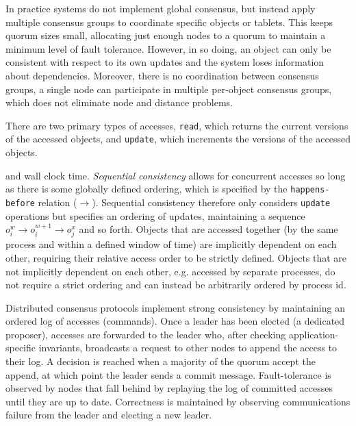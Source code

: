 In practice systems do not implement global consensus, but instead apply multiple
consensus groups to coordinate specific objects or tablets.
This keeps quorum sizes small, allocating just enough nodes to a quorum to maintain a
minimum level of fault tolerance.
However, in so doing, an object can only be consistent with respect to its own updates
and the system loses information about dependencies.
Moreover, there is no coordination between consensus groups, a single node can
participate in multiple per-object consensus groups, which does not eliminate node and
distance problems.


There are two primary types of accesses, \texttt{read}, which returns the
current versions of the accessed objects, and \texttt{update}, which
increments the versions of the accessed objects.

and wall clock time.
\emph{Sequential consistency} allows for concurrent accesses so long as there
is some globally defined ordering, which is specified by the
\texttt{happens-before} relation ($\rightarrow$).
Sequential consistency therefore only considers \texttt{update} operations but
specifies an ordering of updates, maintaining a sequence $o_i^w \rightarrow
o_i^{w+1} \rightarrow o_j^x$ and so forth.
Objects that are accessed together (by the same process and within a defined
window of time) are implicitly dependent on each other, requiring their
relative access order to be strictly defined.
Objects that are not implicitly dependent on each other, e.g.
accessed by separate processes, do not require a strict ordering and can
instead be arbitrarily ordered by process id.

Distributed consensus protocols implement strong consistency by maintaining an
ordered log of accesses (commands).
Once a leader has been elected (a dedicated proposer), accesses are forwarded
to the leader who, after checking application-specific invariants, broadcasts
a request to other nodes to append the access to their log.
A decision is reached when a majority of the quorum accept the append, at
which point the leader sends a commit message.
Fault-tolerance is observed by nodes that fall behind by replaying the log of
committed accesses until they are up to date.
Correctness is maintained by observing communications failure from the leader
and electing a new leader.

